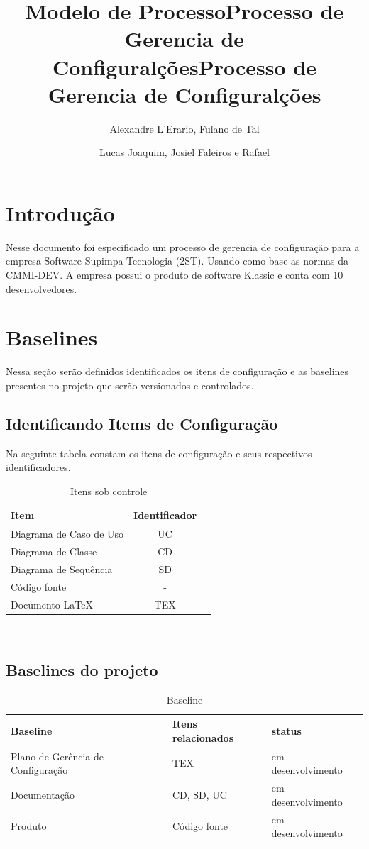 \documentclass{article}
\title{Modelo de Processo}
\title{Processo de Gerencia de Configuralções}
\author{Alexandre L'Erario, Fulano de Tal }  	%
\date{}
\title{Processo de Gerencia de Configuralções}
\author{Lucas Joaquim, Josiel Faleiros e Rafael }
\begin{document}
	\maketitle
    \newpage
	\tableofcontents
	\newpage
	\section{Introdução}
    Nesse documento foi especificado um processo de gerencia de configuração para a empresa Software Supimpa Tecnologia (2ST). Usando como base as normas da CMMI-DEV. A empresa possui o produto de software Klassic e conta com 10 desenvolvedores.
    \section{Baselines}
	    Nessa seção serão definidos identificados os itens de configuração e as baselines presentes no projeto que serão versionados e controlados.
        \subsection{Identificando Items de Configuração}
          Na seguinte tabela constam os itens de configuração e seus respectivos identificadores.
          \begin{table}[H]
              \begin{tabular}{l c r}
                  \textbf{Item} & \textbf{Identificador}\\
                  \hline
                  Diagrama de Caso de Uso & UC \\
                  Diagrama de Classe & CD \\
                  Diagrama de Sequência  & SD \\
                  Código fonte  & -\\
                  Documento LaTeX & TEX \\
              \end{tabular}\\
              \caption{Itens sob controle}
          \end{table}
          \subsection{Baselines do projeto}
          \begin{table}[H]
              \begin{tabular}{l l l}
                  \textbf{Baseline} & \textbf{Itens relacionados} & \textbf{status}\\
                  \hline
                  Plano de Gerência de Configuração & TEX & em desenvolvimento \\
                  Documentação & CD, SD, UC & em desenvolvimento \\
                  Produto & Código fonte & em desenvolvimento\\
              \end{tabular}\\
              \caption{Baseline}
          \end{table}
\end{document}
